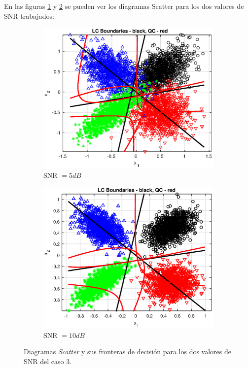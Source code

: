 \documentclass[11pt]{article} %
\begin{document}
En las figuras \ref{fig:c3:snr05} y \ref{fig:c3:snr10}  se pueden ver los diagramas Scatter para los dos valores de SNR trabajados:

\begin{figure}[h]
	\centering
	\begin{subfigure}[b]{0.475 \textwidth}
		\centering
		\includegraphics[width=\textwidth]{../Part_2/caso3_05dB.eps}
		\caption[]{\small SNR $= 5dB$}
		\label{fig:c3:snr05}
	\end{subfigure}
	\quad
	\begin{subfigure}[b]{0.475 \textwidth}
		\centering
		\includegraphics[width=\textwidth]{../Part_2/caso3_10dB.eps}
		\caption[]{\small SNR $= 10dB$} 
		\label{fig:c3:snr10}
	\end{subfigure}
	\caption{Diagramas \emph{Scatter} y sus fronteras de decisión para los dos valores de SNR del caso 3.}
	\label{fig:c3:scatter}
\end{figure}
\end{document}
